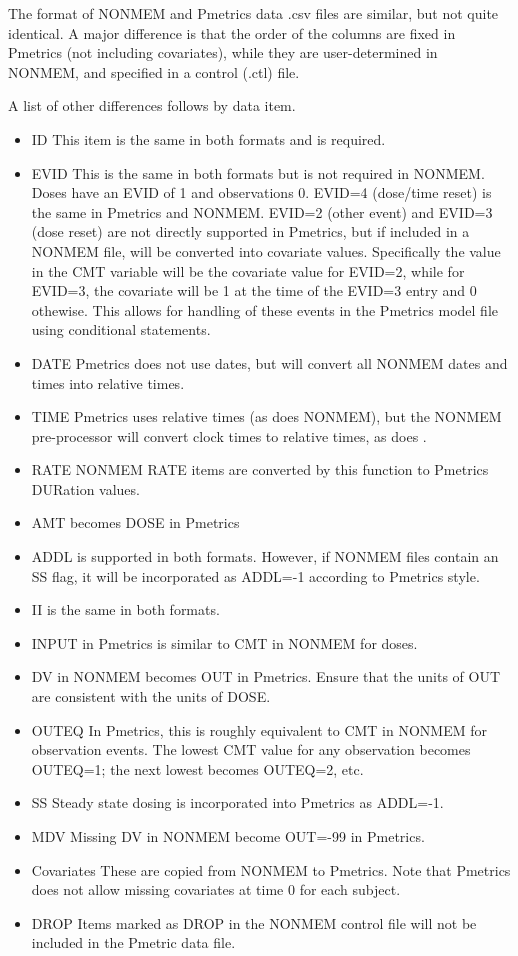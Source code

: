 \documentclass[a4paper]{book}
\begin{document}
\begin{Details}\relax
The format of NONMEM and Pmetrics data .csv files are similar, but not quite identical.
A major difference is that the order of the columns are fixed in Pmetrics (not including covariates),
while they are user-determined in NONMEM, and specified in a control (.ctl) file.

A list of other differences follows by data item.
\begin{itemize}

\item{} ID This item is the same in both formats and is required.
\item{} EVID This is the same in both formats but is not required in NONMEM.  Doses have an EVID
of 1 and observations 0.  EVID=4 (dose/time reset) is the same in Pmetrics and NONMEM. 
EVID=2 (other event) and EVID=3 (dose reset) are not directly supported in Pmetrics, but if included
in a NONMEM file, will be converted into covariate values.  Specifically the value in the CMT variable will
be the covariate value for EVID=2, while for EVID=3, the covariate will be 1 at the time of the EVID=3 entry
and 0 othewise.  This allows for handling of these events in the Pmetrics model file using conditional statements.
\item{} DATE Pmetrics does not use dates, but will convert all NONMEM dates and times into relative times.
\item{} TIME Pmetrics uses relative times (as does NONMEM), but the NONMEM pre-processor will convert clock times
to relative times, as does .
\item{} RATE NONMEM RATE items are converted by this function to Pmetrics DURation values.
\item{} AMT becomes DOSE in Pmetrics
\item{} ADDL is supported in both formats.  However, if NONMEM files contain an SS flag, it will be
incorporated as ADDL=-1 according to Pmetrics style.
\item{} II is the same in both formats.
\item{} INPUT in Pmetrics is similar to CMT in NONMEM for doses.  
\item{} DV in NONMEM becomes OUT in Pmetrics.  Ensure that the units of OUT are consistent with the
units of DOSE.
\item{} OUTEQ In Pmetrics, this is roughly equivalent to CMT in NONMEM for observation events.  
The lowest CMT value for any observation becomes OUTEQ=1; the next lowest becomes OUTEQ=2, etc.
\item{} SS Steady state dosing is incorporated into Pmetrics as ADDL=-1.
\item{} MDV Missing DV in NONMEM become OUT=-99 in Pmetrics.
\item{} Covariates These are copied from NONMEM to Pmetrics.  Note that Pmetrics does not allow
missing covariates at time 0 for each subject.
\item{} DROP Items marked as DROP in the NONMEM control file will not be included in the Pmetric data file.


\end{itemize}
\end{Details}
\end{document}
